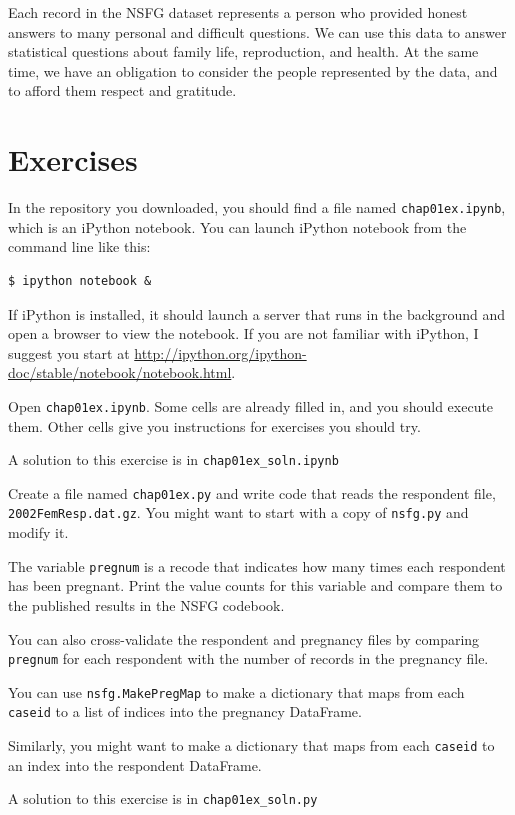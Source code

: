 \documentclass[12pt]{book}
\begin{document}
Each record in the NSFG dataset represents a person who provided
honest answers to many personal and difficult questions.  We can use
this data to answer statistical questions about family life,
reproduction, and health.  At the same time, we have an obligation
to consider the people represented by the data, and to afford them
respect and gratitude.


\section{Exercises}

\begin{exercise}
In the repository you downloaded, you should find a file named
\verb"chap01ex.ipynb", which is an iPython notebook.  You can
launch iPython notebook from the command line like this:

\begin{verbatim}
$ ipython notebook &
\end{verbatim}

If iPython is installed, it should launch a server that runs in the
background and open a browser to view the notebook.  If you are not
familiar with iPython, I suggest you start at
\url{http://ipython.org/ipython-doc/stable/notebook/notebook.html}.

Open \verb"chap01ex.ipynb".  Some cells are already filled in, and
you should execute them.  Other cells give you instructions for
exercises you should try.

A solution to this exercise is in \verb"chap01ex_soln.ipynb"
\end{exercise}


\begin{exercise}
Create a file named \verb"chap01ex.py" and write code that reads
the respondent file, {\tt 2002FemResp.dat.gz}.  You might want to
start with a copy of {\tt nsfg.py} and modify it.

The variable {\tt pregnum} is a recode that indicates how many
times each respondent has been pregnant.  Print the value counts
for this variable and compare them to the published results in
the NSFG codebook.

You can also cross-validate the respondent and pregnancy files by
comparing {\tt pregnum} for each respondent with the number of
records in the pregnancy file.

You can use {\tt nsfg.MakePregMap} to make a dictionary that maps
from each {\tt caseid} to a list of indices into the pregnancy
DataFrame.

Similarly, you might want to make a dictionary that maps from each
{\tt caseid} to an index into the respondent DataFrame.

A solution to this exercise is in \verb"chap01ex_soln.py"
\end{exercise}
\end{document}
